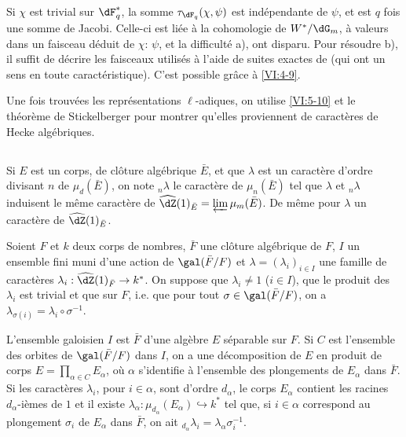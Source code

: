 Si $\chi$ est trivial sur $\dF_q^\ast$, la somme $\tau_{\dF_q}(\chi,\psi)$ 
est indépendante de $\psi$, et est $q$ fois une somme de Jacobi. Celle-ci est 
liée à la cohomologie de $W^\ast/\dG_m$, à valeurs dans un faisceau 
déduit de $\chi$: $\psi$, et la difficulté a), ont disparu. Pour 
résoudre b), il suffit de décrire les faisceaux utilisés à l'aide de 
suites exactes de  (qui ont un sens en toute caractéristique). C'est 
possible gr\^ace à \ref{VI:4-9}. 

Une fois trouvées les représentations $\ell$-adiques, on utilise 
\ref{VI:5-10} et le théorème de Stickelberger pour montrer qu'elles 
proviennent de caractères de Hecke algébriques. 





\subsection{}\label{VI:6-1}

Si $E$ est un corps, de clôture algébrique $\bar E$, et que $\lambda$ est 
un caractère d'ordre divisant $n$ de $\mu_d(\bar E)$, on note $_n\lambda$ le 
caractère de $\mu_n(\bar E)$ tel que $\lambda$ et $_n \lambda$ induisent le 
même caractère de $\widehat\dZ(1)_{\bar E} = \varprojlim \mu_m(\bar E)$. De 
même pour $\lambda$ un caractère de $\widehat\dZ(1)_{\bar E}$. 

Soient $F$ et $k$ deux corps de nombres, $\bar F$ une clôture algébrique de 
$F$, $I$ un ensemble fini muni d'une action de $\gal(\bar F/F)$ et 
$\lambda=(\lambda_i)_{i\in I}$ une famille de caractères 
$\lambda_i:\widehat\dZ(1)_{\bar F} \to k^\ast$. On suppose que 
$\lambda_i\ne 1$ ($i\in I$), que 
le produit des $\lambda_i$ est trivial et que 
 sur $F$, i.e. que pour tout 
$\sigma\in \gal(\bar F/F)$, on a 
$\lambda_{\sigma(i)}=\lambda_i\circ \sigma^{-1}$. 

L'ensemble galoisien $I$ est  $\bar F$ d'une 
alg\`ebre $E$ séparable sur $F$. Si $C$ est l'ensemble des orbites de 
$\gal(\bar F/F)$ dans $I$, on a une décomposition de $E$ en produit de corps 
$E=\prod_{\alpha\in C} E_\alpha$, où $\alpha$ s'identifie à l'ensemble des 
plongements de $E_\alpha$ dans $\bar F$. Si les caractères $\lambda_i$, pour 
$i\in \alpha$, sont d'ordre $d_\alpha$, le corps $E_\alpha$ contient les 
racines $d_\alpha$-ièmes de $1$ et il existe 
$\lambda_\alpha:\mu_{d_\alpha}(E_\alpha) \hookrightarrow k^\ast$  tel que, si 
$i\in \alpha$ correspond au plongement $\sigma_i$ de $E_\alpha$ dans $\bar F$, 
on ait $_{d_\alpha} \lambda_i = \lambda_\alpha \sigma_i^{-1}$. 





